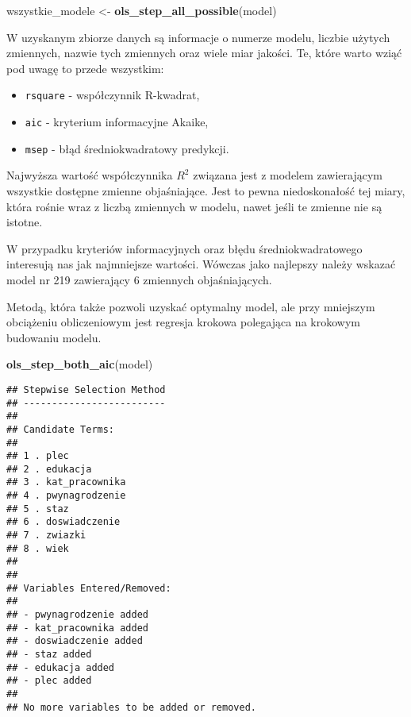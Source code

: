 \documentclass[]{book}
\newenvironment{Shaded}{\begin{snugshade}}{\end{snugshade}}
\newcommand{\KeywordTok}[1]{\textcolor[rgb]{0.13,0.29,0.53}{\textbf{#1}}}
\newcommand{\StringTok}[1]{\textcolor[rgb]{0.31,0.60,0.02}{#1}}
\newcommand{\NormalTok}[1]{#1}
\providecommand{\tightlist}{%
  \setlength{\itemsep}{0pt}\setlength{\parskip}{0pt}}
\begin{document}
\begin{Shaded}
\begin{Highlighting}[]
\NormalTok{wszystkie_modele <-}\StringTok{ }\KeywordTok{ols_step_all_possible}\NormalTok{(model)}
\end{Highlighting}
\end{Shaded}

W uzyskanym zbiorze danych są informacje o numerze modelu, liczbie
użytych zmiennych, nazwie tych zmiennych oraz wiele miar jakości. Te,
które warto wziąć pod uwagę to przede wszystkim:

\begin{itemize}
\tightlist
\item
  \texttt{rsquare} - współczynnik R-kwadrat,
\item
  \texttt{aic} - kryterium informacyjne Akaike,
\item
  \texttt{msep} - błąd średniokwadratowy predykcji.
\end{itemize}

Najwyższa wartość współczynnika \(R^2\) związana jest z modelem
zawierającym wszystkie dostępne zmienne objaśniające. Jest to pewna
niedoskonałość tej miary, która rośnie wraz z liczbą zmiennych w modelu,
nawet jeśli te zmienne nie są istotne.

W przypadku kryteriów informacyjnych oraz błędu średniokwadratowego
interesują nas jak najmniejsze wartości. Wówczas jako najlepszy należy
wskazać model nr 219 zawierający 6 zmiennych objaśniających.

Metodą, która także pozwoli uzyskać optymalny model, ale przy mniejszym
obciążeniu obliczeniowym jest regresja krokowa polegająca na krokowym
budowaniu modelu.

\begin{Shaded}
\begin{Highlighting}[]
\KeywordTok{ols_step_both_aic}\NormalTok{(model)}
\end{Highlighting}
\end{Shaded}

\begin{verbatim}
## Stepwise Selection Method 
## -------------------------
## 
## Candidate Terms: 
## 
## 1 . plec 
## 2 . edukacja 
## 3 . kat_pracownika 
## 4 . pwynagrodzenie 
## 5 . staz 
## 6 . doswiadczenie 
## 7 . zwiazki 
## 8 . wiek 
## 
## 
## Variables Entered/Removed: 
## 
## - pwynagrodzenie added 
## - kat_pracownika added 
## - doswiadczenie added 
## - staz added 
## - edukacja added 
## - plec added 
## 
## No more variables to be added or removed.
\end{verbatim}
\end{document}
